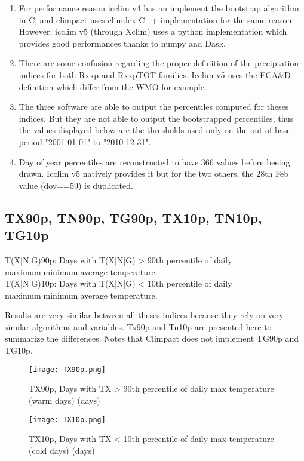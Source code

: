 \documentclass[a4paper,11pt]{article}
\begin{document}
    \begin{enumerate}
        \item For performance reason icclim v4 has an implement the bootstrap algorithm in C, and climpact uses climdex C++ implementation for the same reason. However, icclim v5 (through Xclim) uses a python implementation which provides good performances thanks to numpy and Dask.
        \item There are some confusion regarding the proper definition of the preciptation indices for both Rxxp and RxxpTOT families. Icclim v5 uses the ECA\&D definition which differ from the WMO for example.
        \item The three software are able to output the percentiles computed for theses indices. But they are not able to output the bootstrapped percentiles, thus the values displayed below are the thresholds used only on the out of base period "2001-01-01" to "2010-12-31".
        \item Day of year percentiles are reconstructed to have 366 values before beeing drawn. Icclim v5 natively provides it but for the two others, the 28th Feb value (doy==59) is duplicated. 
    \end{enumerate}


\subsection{TX90p, TN90p, TG90p, TX10p, TN10p, TG10p}
    T(X|N|G)90p: Days with T(X|N|G) > 90th percentile of daily maximum|minimum|average temperature.\\
    T(X|N|G)10p: Days with T(X|N|G) < 10th percentile of daily maximum|minimum|average temperature.

    Results are very similar between all theses indices because they rely on very similar algorithms and variables. Tx90p and Tn10p are presented here to summarize the differences.
    Notes that Climpact does not implement TG90p and TG10p.

    \begin{figure}[!hbt]
        \centering
        \texttt{[image: TX90p.png]}
        \caption{TX90p, Days with TX > 90th percentile of daily max temperature (warm
        days) (days)}
        \label{figure/tx90p}
    \end{figure}

    \begin{figure}[!hbt]
        \centering
        \texttt{[image: TX10p.png]}
        \caption{TX10p, Days with TX < 10th percentile of daily max temperature (cold days) (days)}
        \label{figure/tx10p}
    \end{figure}
\end{document}
